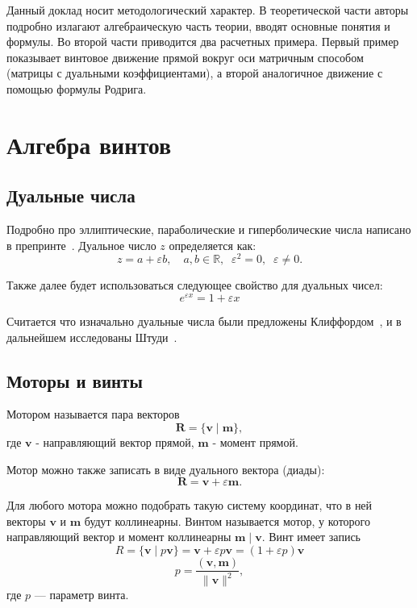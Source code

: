 \documentclass[%
]{ittmm}
\begin{document}
Данный доклад носит методологический характер. В теоретической части авторы подробно излагают 
алгебраическую часть теории, вводят основные понятия и формулы. Во второй части приводится два расчетных
примера. Первый пример показывает винтовое движение прямой вокруг оси матричным способом 
(матрицы с дуальными коэффициентами), а второй аналогичное движение с помощью формулы Родрига.

\section{Алгебра винтов}

\subsection{Дуальные числа}
Подробно про эллиптические, параболические и гиперболические числа написано в препринте~\cite{gevorkyanApproachesImplementationGeneralized2020}.
Дуальное число $z$ определяется как:
\begin{equation*}
  z=a+\varepsilon b, \quad a,b \in \mathbb{R},\;\; \varepsilon^2=0,\;\; \varepsilon \ne 0.  
\end{equation*}

Также далее будет использоваться следующее свойство для дуальных чисел:
\begin{equation*}
  e^{\varepsilon x} = 1 + \varepsilon x
\end{equation*}

Считается что изначально дуальные числа были предложены Клиффордом~\cite{cliffordPreliminarySketchBiquaternions1871},
и в дальнейшем исследованы Штуди~\cite{zindlerGeometrieDynamenStudy1903}.

\subsection{Моторы и винты}

Мотором называется пара векторов 
\begin{equation*}
  \mathbf{R} = \{ \mathbf{v} \mid \mathbf{m} \},
\end{equation*}
где $\mathbf{v}$ - направляющий вектор прямой, $\mathbf{m}$ - момент прямой.

Мотор можно также записать в виде дуального вектора (диады): 
\begin{equation*}
  \mathbf{R} = \mathbf{v} + \varepsilon \mathbf{m}.
\end{equation*}

Для любого мотора можно подобрать такую систему координат, что в ней векторы $\mathbf{v}$ и $\mathbf{m}$ будут коллинеарны.
Винтом называется мотор, у которого направляющий вектор и момент коллинеарны $\mathbf{m} \mid \mathbf{v}$. Винт имеет запись
\begin{equation*}
  R = \{ \mathbf{v} \mid p\mathbf{v} \} = \mathbf{v} + \varepsilon p \mathbf{v} = (1+\varepsilon p)\mathbf{v}
\end{equation*}
\begin{equation*}
  p=\frac{(\mathbf{v}, \mathbf{m})}{\| \mathbf{v} \|^2},
\end{equation*}
где $p$ --- параметр винта.
\end{document}
